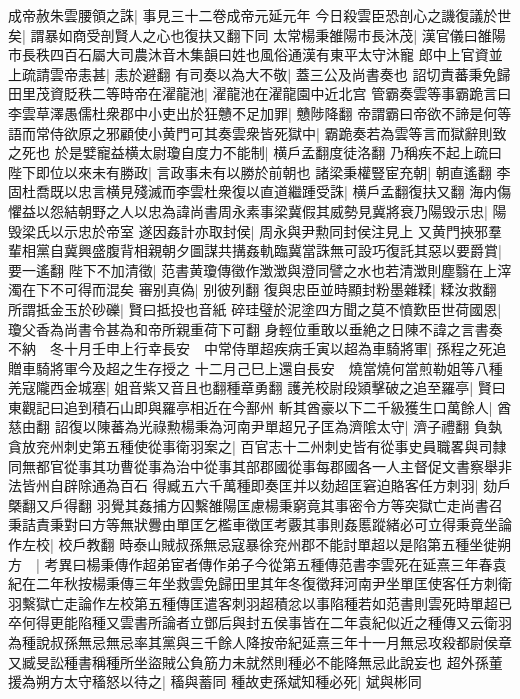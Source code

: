 成帝赦朱雲腰領之誅|{
	事見三十二卷成帝元延元年}
今日殺雲臣恐剖心之譏復議於世矣|{
	謂暴如商受剖賢人之心也復扶又翻下同}
太常楊秉雒陽市長沐茂|{
	漢官儀曰雒陽市長秩四百石屬大司農沐音木集韻曰姓也風俗通漢有東平太守沐寵}
郎中上官資並上疏請雲帝恚甚|{
	恚於避翻}
有司奏以為大不敬|{
	蓋三公及尚書奏也}
詔切責蕃秉免歸田里茂資貶秩二等時帝在濯龍池|{
	濯龍池在濯龍園中近北宫}
管霸奏雲等事霸跪言曰李雲草澤愚儒杜衆郡中小吏出於狂戇不足加罪|{
	戇陟降翻}
帝謂霸曰帝欲不諦是何等語而常侍欲原之邪顧使小黄門可其奏雲衆皆死獄中|{
	霸跪奏若為雲等言而獄辭則致之死也}
於是嬖寵益横太尉瓊自度力不能制|{
	横戶孟翻度徒洛翻}
乃稱疾不起上疏曰陛下即位以來未有勝政|{
	言政事未有以勝於前朝也}
諸梁秉權豎宦充朝|{
	朝直遙翻}
李固杜喬既以忠言横見殘滅而李雲杜衆復以直道繼踵受誅|{
	横戶孟翻復扶又翻}
海内傷懼益以怨結朝野之人以忠為諱尚書周永素事梁冀假其威勢見冀將衰乃陽毁示忠|{
	陽毁梁氏以示忠於帝室}
遂因姦計亦取封侯|{
	周永與尹勲同封侯注見上}
又黄門挾邪羣輩相黨自冀興盛腹背相親朝夕圖謀共搆姦軌臨冀當誅無可設巧復託其惡以要爵賞|{
	要一遙翻}
陛下不加清徵|{
	范書黄瓊傳徵作澂澂與澄同譬之水也若清澂則塵翳在上滓濁在下不可得而混矣}
審别真偽|{
	别彼列翻}
復與忠臣並時顯封粉墨雜糅|{
	糅汝救翻}
所謂抵金玉於砂礫|{
	賢曰抵投也音紙}
碎珪璧於泥塗四方聞之莫不憤歎臣世荷國恩|{
	瓊父香為尚書令甚為和帝所親重荷下可翻}
身輕位重敢以垂絶之日陳不諱之言書奏不納　冬十月壬申上行幸長安　中常侍單超疾病壬寅以超為車騎將軍|{
	孫程之死追贈車騎將軍今及超之生存授之}
十二月己巳上還自長安　燒當燒何當煎勒姐等八種羌寇隴西金城塞|{
	姐音紫又音且也翻種章勇翻}
護羌校尉段熲擊破之追至羅亭|{
	賢曰東觀記曰追到積石山即與羅亭相近在今鄯州}
斬其酋豪以下二千級獲生口萬餘人|{
	酋慈由翻}
詔復以陳蕃為光祿勲楊秉為河南尹單超兄子匡為濟隂太守|{
	濟子禮翻}
負埶貪放兖州刺史第五種使從事衛羽案之|{
	百官志十二州刺史皆有從事史員職畧與司隸同無都官從事其功曹從事為治中從事其部郡國從事每郡國各一人主督促文書察舉非法皆州自辟除通為百石}
得臧五六千萬種即奏匡并以劾超匡窘迫賂客任方刺羽|{
	劾戶槩翻又戶得翻}
羽覺其姦捕方囚繫雒陽匡慮楊秉窮竟其事密令方等突獄亡走尚書召秉詰責秉對曰方等無狀釁由單匡乞檻車徵匡考覈其事則姦慝蹤緒必可立得秉竟坐論作左校|{
	校戶教翻}
時泰山賊叔孫無忌寇暴徐兖州郡不能討單超以是陷第五種坐徙朔方　|{
	考異曰楊秉傳作超弟宦者傳作弟子今從第五種傳范書李雲死在延熹三年春袁紀在二年秋按楊秉傳三年坐救雲免歸田里其年冬復徵拜河南尹坐單匡使客任方刺衛羽繫獄亡走論作左校第五種傳匡遣客刺羽超積忿以事陷種若如范書則雲死時單超已卒何得更能陷種又雲書所論者立鄧后與封五侯事皆在二年袁紀似近之種傳又云衛羽為種說叔孫無忌無忌率其黨與三千餘人降按帝紀延熹三年十一月無忌攻殺都尉侯章又臧旻訟種書稱種所坐盜賊公負筋力未就然則種必不能降無忌此說妄也}
超外孫董援為朔方太守稸怒以待之|{
	稸與蓄同}
種故吏孫斌知種必死|{
	斌與彬同}
